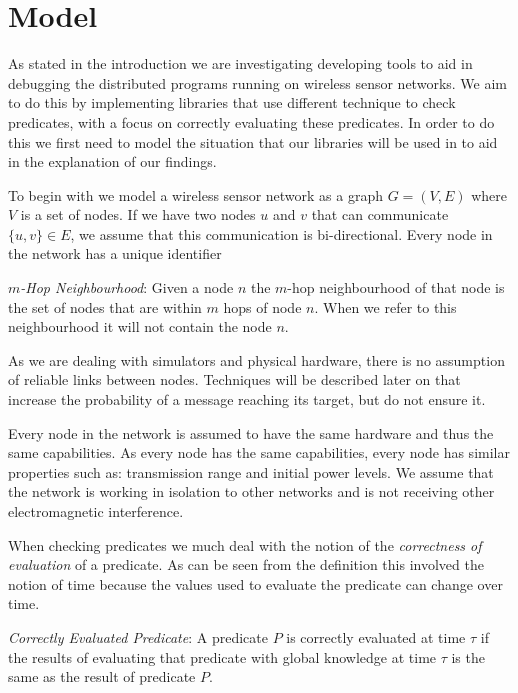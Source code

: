 \section{Model}

As stated in the introduction we are investigating developing tools to aid in debugging the distributed programs running on wireless sensor networks. We aim to do this by implementing libraries that use different technique to check predicates, with a focus on correctly evaluating these predicates. In order to do this we first need to model the situation that our libraries will be used in to aid in the explanation of our findings.

To begin with we model a wireless sensor network as a graph $G = (V, E)$ where $V$ is a set of nodes. If we have two nodes $u$ and $v$ that can communicate $\{u, v\} \in E$, we assume that this communication is bi-directional. Every node in the network has a unique identifier 

\begin{mydef}
\emph{$m$-Hop Neighbourhood}: Given a node $n$ the $m$-hop neighbourhood of that node is the set of nodes that are within $m$ hops of node $n$. When we refer to this neighbourhood it will not contain the node $n$.
\end{mydef}

As we are dealing with simulators and physical hardware, there is no assumption of reliable links between nodes. Techniques will be described later on that increase the probability of a message reaching its target, but do not ensure it.

Every node in the network is assumed to have the same hardware and thus the same capabilities. As every node has the same capabilities, every node has similar properties such as: transmission range and initial power levels. We assume that the network is working in isolation to other networks and is not receiving other electromagnetic interference.

When checking predicates we much deal with the notion of the \emph{correctness of evaluation} of a predicate. As can be seen from the definition this involved the notion of time because the values used to evaluate the predicate can change over time.

\begin{mydef}
\emph{Correctly Evaluated Predicate}: A predicate $P$ is correctly evaluated at time $\tau$ if the results of evaluating that predicate with global knowledge at time $\tau$ is the same as the result of predicate $P$.
\end{mydef}


